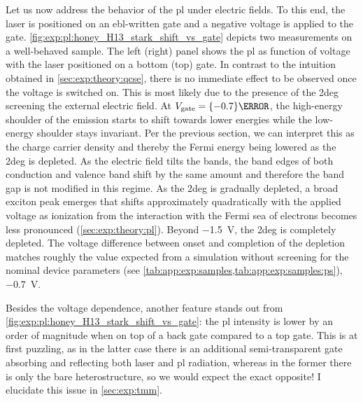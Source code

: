Let us now address the behavior of the \gls{pl} under electric fields.
To this end, the laser is positioned on an \gls{ebl}-written gate and a negative voltage is applied to the gate.
\cref{fig:exp:pl:honey_H13_stark_shift_vs_gate} depicts two measurements on a well-behaved sample.
The left (right) panel shows the \gls{pl} as function of voltage with the laser positioned on a bottom (top) gate.
In contrast to the intuition obtained in \cref{sec:exp:theory:qcse}, there is no immediate effect to be observed once the voltage is switched on.
This is most likely due to the presence of the \gls{2deg} screening the external electric field. %
At $V_{\mr{gate}} = \qty{-0.7}{\volt}$, the high-energy shoulder of the emission starts to shift towards lower energies while the low-energy shoulder stays invariant.
Per the previous section, we can interpret this as the charge carrier density and thereby the Fermi energy being lowered as the \gls{2deg} is depleted.
As the electric field tilts the bands, the band edges of both conduction and valence band shift by the same amount and therefore the band gap is not modified in this regime.
As the \gls{2deg} is gradually depleted, a broad exciton peak emerges that shifts approximately quadratically with the applied voltage as ionization from the interaction with the Fermi sea of electrons becomes less pronounced (\cf \cref{sec:exp:theory:pl}).
Beyond \qty{-1.5}{\volt}, the \gls{2deg} is completely depleted.
The voltage difference between onset and completion of the depletion matches roughly the value expected from a simulation without screening for the nominal device parameters (see \cref{tab:app:exp:samples,tab:app:exp:samples:ps}), \qty{-0.7}{\volt}.

Besides the voltage dependence, another feature stands out from \cref{fig:exp:pl:honey_H13_stark_shift_vs_gate}: the \gls{pl} intensity is lower by an order of magnitude when on top of a back gate compared to a top gate.
This is at first puzzling, as in the latter case there is an additional semi-transparent gate
absorbing and reflecting both laser and \gls{pl} radiation, whereas in the former there is only the bare heterostructure, so we would expect the exact opposite!
I elucidate this issue in \cref{sec:exp:tmm}.

